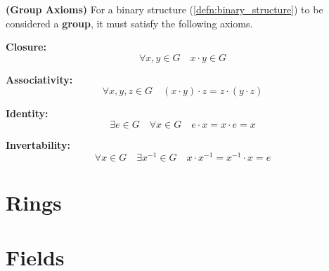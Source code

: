 \begin{axiomset}
\label{axioms:group}
  \textbf{(Group Axioms)}
  For a binary structure (\ref{defn:binary_structure}) to be considered a \textbf{group}, it must satisfy the following axioms.
  \begin{axiom}
     \textbf{Closure:}
     \begin{equation}
       \forall x,y \in G \quad x\cdot y \in G
     \end{equation}
  \end{axiom}
  \begin{axiom}
     \textbf{Associativity:}
     \begin{equation}
       \forall x,y,z \in G \quad (x\cdot y) \cdot z = z \cdot (y \cdot z)
     \end{equation}
  \end{axiom}
  \begin{axiom}
     \textbf{Identity:}
     \begin{equation}
       \exists e \in G \quad \forall x \in G \quad e\cdot x = x \cdot e = x
     \end{equation}
  \end{axiom}
  \begin{axiom}
     \textbf{Invertability:}
     \begin{equation}
       \forall x \in G \quad \exists x^{-1} \in G \quad x \cdot x^{-1} = x^{-1} \cdot x = e
     \end{equation}
  \end{axiom}
\end{axiomset}



\section{Rings}

\section{Fields}

